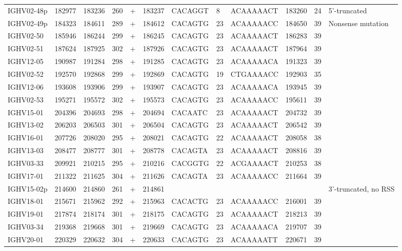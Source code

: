 \begin{tabular}{lrrrlrlllrrl}
  IGHV02-48p & 182977 & 183236 & 260 & + & 183237 & CACAGGT & 8 & ACAAAAACT & 183260 & 24 & 5'-truncated \\ 
  IGHV02-49p & 184323 & 184611 & 289 & + & 184612 & CACAGTG & 23 & ACAAAAACC & 184650 & 39 & Nonsense mutation \\ 
  IGHV02-50 & 185946 & 186244 & 299 & + & 186245 & CACAGTG & 23 & ACAAAAACT & 186283 & 39 &  \\ 
  IGHV02-51 & 187624 & 187925 & 302 & + & 187926 & CACAGTG & 23 & ACAAAAACT & 187964 & 39 &  \\ 
  IGHV12-05 & 190987 & 191284 & 298 & + & 191285 & CACAGTG & 23 & ACAAAAACA & 191323 & 39 &  \\ 
  IGHV02-52 & 192570 & 192868 & 299 & + & 192869 & CACAGTG & 19 & CTGAAAACC & 192903 & 35 &  \\ 
  IGHV12-06 & 193608 & 193906 & 299 & + & 193907 & CACAGTG & 23 & ACAAAAACA & 193945 & 39 &  \\ 
  IGHV02-53 & 195271 & 195572 & 302 & + & 195573 & CACAGTG & 23 & ACAAAAACC & 195611 & 39 &  \\ 
  IGHV15-01 & 204396 & 204693 & 298 & + & 204694 & CACAATC & 23 & ACAAAAACT & 204732 & 39 &  \\ 
  IGHV13-02 & 206203 & 206503 & 301 & + & 206504 & CACAGTG & 23 & ACAAAAACT & 206542 & 39 &  \\ 
  IGHV16-01 & 207726 & 208020 & 295 & + & 208021 & CACAGTG & 22 & ACAAAAACT & 208058 & 38 &  \\ 
  IGHV13-03 & 208477 & 208777 & 301 & + & 208778 & CACAGTA & 23 & ACAAAAACT & 208816 & 39 &  \\ 
  IGHV03-33 & 209921 & 210215 & 295 & + & 210216 & CACGGTG & 22 & ACGAAAACT & 210253 & 38 &  \\ 
  IGHV17-01 & 211322 & 211625 & 304 & + & 211626 & CACAGTA & 23 & ACAAAAACC & 211664 & 39 &  \\ 
  IGHV15-02p & 214600 & 214860 & 261 & + & 214861 &  &  &  &  &  & 3'-truncated, no RSS \\ 
  IGHV18-01 & 215671 & 215962 & 292 & + & 215963 & CACACTG & 23 & ACAAAAACC & 216001 & 39 &  \\ 
  IGHV19-01 & 217874 & 218174 & 301 & + & 218175 & CACAGTG & 23 & ACAAAAACT & 218213 & 39 &  \\ 
  IGHV03-34 & 219368 & 219668 & 301 & + & 219669 & CACAGTG & 23 & ACAAAAACA & 219707 & 39 &  \\ 
  IGHV20-01 & 220329 & 220632 & 304 & + & 220633 & CACAGTG & 23 & ACAAAAATT & 220671 & 39 &  \\ 

\end{tabular}
